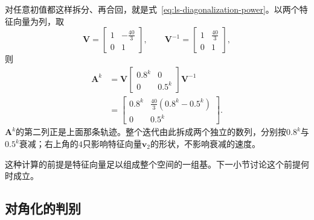 \begin{example}[用特征向量计算矩阵幂]
对任意初值都这样拆分、再合回，就是式~\eqref{eq:ls-diagonalization-power}。以两个特征向量为列，取
\[
 \bm V=\begin{bmatrix}1&-\tfrac{40}{3}\\0&1\end{bmatrix},\qquad
 \bm V^{-1}=\begin{bmatrix}1&\tfrac{40}{3}\\0&1\end{bmatrix},
\]
则
\[
 \begin{aligned}
 \bm A^k&=\bm V\begin{bmatrix}0.8^k&0\\0&0.5^k\end{bmatrix}\bm V^{-1}\\
 &=\begin{bmatrix}0.8^k&\tfrac{40}{3}(0.8^k-0.5^k)\\0&0.5^k\end{bmatrix}.
 \end{aligned}
\]
$\bm A^k$的第二列正是上面那条轨迹。整个迭代由此拆成两个独立的数列，分别按$0.8^k$与$0.5^k$衰减；右上角的$4$只影响特征向量$\bm v_2$的形状，不影响衰减的速度。
\end{example}
这种计算的前提是特征向量足以组成整个空间的一组基。下一小节讨论这个前提何时成立。

\subsection{对角化的判别}

